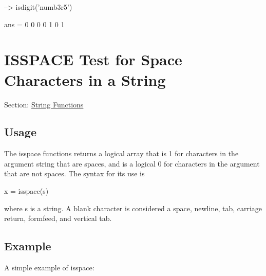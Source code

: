 \begin{DoxyVerbInclude}
--> isdigit('numb3r5')

ans = 
 0 0 0 0 1 0 1 
\end{DoxyVerbInclude}
 \hypertarget{string_isspace}{}\section{I\-S\-S\-P\-A\-C\-E Test for Space Characters in a String}\label{string_isspace}
Section\-: \hyperlink{sec_string}{String Functions} \hypertarget{vtkwidgets_vtkxyplotwidget_Usage}{}\subsection{Usage}\label{vtkwidgets_vtkxyplotwidget_Usage}
The {\ttfamily isspace} functions returns a logical array that is 1 for characters in the argument string that are spaces, and is a logical 0 for characters in the argument that are not spaces. The syntax for its use is \begin{DoxyVerb}   x = isspace(s)
\end{DoxyVerb}
 where {\ttfamily s} is a {\ttfamily string}. A blank character is considered a space, newline, tab, carriage return, formfeed, and vertical tab. \hypertarget{variables_struct_Example}{}\subsection{Example}\label{variables_struct_Example}
A simple example of {\ttfamily isspace}\-:


